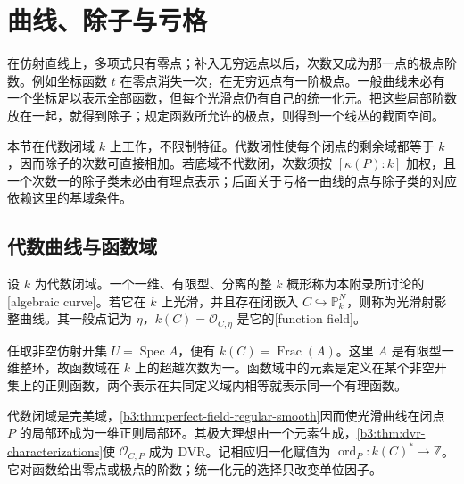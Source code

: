 
\section{曲线、除子与亏格}
\label{b3:sec:H01}

在仿射直线上，多项式只有零点；补入无穷远点以后，次数又成为那一点的极点阶数。例如坐标函数 \(t\) 在零点消失一次，在无穷远点有一阶极点。一般曲线未必有一个坐标足以表示全部函数，但每个光滑点仍有自己的统一化元。把这些局部阶数放在一起，就得到除子；规定函数所允许的极点，则得到一个线丛的截面空间。

\ProseParagraphBreak
本节在代数闭域 \(k\) 上工作，不限制特征。代数闭性使每个闭点的剩余域都等于 \(k\)，因而除子的次数可直接相加。若底域不代数闭，次数须按 \([\kappa(P):k]\) 加权，且一个次数一的除子类未必由有理点表示；后面关于亏格一曲线的点与除子类的对应依赖这里的基域条件。

\subsection{代数曲线与函数域}
\label{b3:subsec:H01:01}

\begin{definition}\label{b3:def:H-smooth-projective-curve}
	设 \(k\) 为代数闭域。一个一维、有限型、分离的整 \(k\) 概形称为本附录所讨论的[algebraic curve]。若它在 \(k\) 上光滑，并且存在闭嵌入 \(C\hookrightarrow\mathbb P_k^N\)，则称为光滑射影整曲线。其一般点记为 \(\eta\)，\(k(C)=\mathcal O_{C,\eta}\) 是它的[function field]。
\end{definition}

任取非空仿射开集 \(U=\operatorname{Spec}A\)，便有 \(k(C)=\operatorname{Frac}(A)\)。这里 \(A\) 是有限型一维整环，故函数域在 \(k\) 上的超越次数为一。函数域中的元素是定义在某个非空开集上的正则函数，两个表示在共同定义域内相等就表示同一个有理函数。

\ProseParagraphBreak
代数闭域是完美域，\cref{b3:thm:perfect-field-regular-smooth}因而使光滑曲线在闭点 \(P\) 的局部环成为一维正则局部环。其极大理想由一个元素生成，\cref{b3:thm:dvr-characterizations}使 \(\mathcal O_{C,P}\) 成为 DVR。记相应归一化赋值为 \(\operatorname{ord}_P:k(C)^*\rightarrow\mathbb Z\)。它对函数给出零点或极点的阶数；统一化元的选择只改变单位因子。


